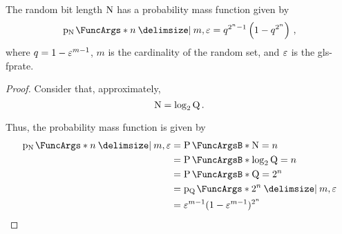 \documentclass[ ../main.tex]{subfiles}
\begin{document}
\begin{theorem}
The random bit length $\mathrm{N}$ has a probability mass function given by
\begin{equation}
\label{eq:N_pmf}
    \PDF{n \Given m, \fprate}[\RV{N}] = q^{2^n-1}\left(1 - q^{2^n}\right)\,,
\end{equation}
where $q = 1 - \varepsilon^{m-1}$, $m$ is the cardinality of the random set, and $\varepsilon$ is the \gls{gls-fprate}.
\end{theorem}
\begin{proof}
Consider that, approximately,
\begin{equation}
    \mathrm{N} = \log_2 \mathrm{Q}\,.
\end{equation}

Thus, the probability mass function is given by
\begin{align}
    \PDF{n \Given m,\fprate}[\RV{N}]
        &= \Prob{\RV{N} = n}\\
        &= \Prob{\log_2 \RV{Q} = n}\\
        &= \Prob{\RV{Q} = 2^n}\\
        &= \PDF{2^n \Given m, \fprate}[\RV{Q}]\\
        &= \fprate^{m-1} (1 - \fprate^{m-1})^{2^n}
\end{align}


\end{proof}
\end{document}
